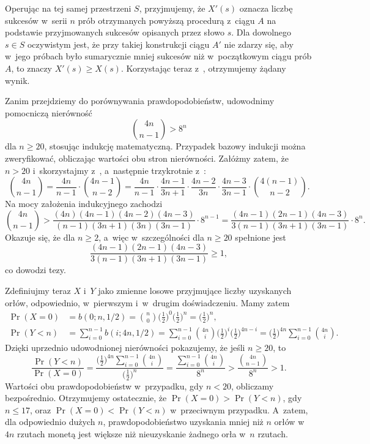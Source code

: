 Operując na tej samej przestrzeni $S$, przyjmujemy, że $X'(s)$ oznacza liczbę sukcesów w~serii $n$ prób otrzymanych powyższą procedurą z~ciągu $A$ na podstawie przyjmowanych sukcesów opisanych przez słowo $s$.
Dla dowolnego $s\in S$ oczywistym jest, że przy takiej konstrukcji ciągu $A'$ nie zdarzy się, aby w~jego próbach było sumarycznie mniej sukcesów niż w~początkowym ciągu prób $A$, to znaczy $X'(s)\ge X(s)$.
Korzystając teraz z~, otrzymujemy żądany wynik.


\exercise %
Zanim przejdziemy do porównywania prawdopodobieństw, udowodnimy pomocniczą nierówność
\[
    \binom{4n}{n-1} > 8^n
\]
dla $n\ge20$, stosując indukcję matematyczną.
Przypadek bazowy indukcji można zweryfikować, obliczając wartości obu stron nierówności.
Załóżmy zatem, że $n>20$ i~skorzystajmy z~, a~następnie trzykrotnie z~:
\[
    \binom{4n}{n-1} = \frac{4n}{n-1}\cdot\binom{4n-1}{n-2} = \frac{4n}{n-1}\cdot\frac{4n-1}{3n+1}\cdot\frac{4n-2}{3n}\cdot\frac{4n-3}{3n-1}\cdot\binom{4(n-1)}{n-2}.
\]
Na mocy założenia indukcyjnego zachodzi
\[
    \binom{4n}{n-1} > \frac{(4n)(4n-1)(4n-2)(4n-3)}{(n-1)(3n+1)(3n)(3n-1)}\cdot8^{n-1} = \frac{(4n-1)(2n-1)(4n-3)}{3(n-1)(3n+1)(3n-1)}\cdot8^n.
\]
Okazuje się, że dla $n\ge2$, a~więc w~szczególności dla $n\ge20$ spełnione jest
\[
    \frac{(4n-1)(2n-1)(4n-3)}{3(n-1)(3n+1)(3n-1)} \ge 1,
\]
co dowodzi tezy.

Zdefiniujmy teraz $X$ i~$Y$ jako zmienne losowe przyjmujące liczby uzyskanych orłów, odpowiednio, w~pierwszym i~w~drugim doświadczeniu.
Mamy zatem
\begin{align*}
	\Pr(X=0) &= b(0;n,1/2) = \binom{n}{0}\biggl(\frac{1}{2}\biggr)^0\biggl(\frac{1}{2}\biggr)^n = \biggl(\frac{1}{2}\biggr)^n, \\
	\Pr(Y<n) &= \sum_{i=0}^{n-1}b(i;4n,1/2) = \sum_{i=0}^{n-1}\binom{4n}{i}\biggl(\frac{1}{2}\biggr)^i\biggl(\frac{1}{2}\biggr)^{4n-i} = \biggl(\frac{1}{2}\biggr)^{4n}\sum_{i=0}^{n-1}\binom{4n}{i}.
\end{align*}
Dzięki uprzednio udowodnionej nierówności pokazujemy, że jeśli $n\ge20$, to
\[
    \frac{\Pr(Y<n)}{\Pr(X=0)} = \frac{\bigl(\frac{1}{2}\bigr)^{4n}\sum_{i=0}^{n-1}\binom{4n}{i}}{\bigl(\frac{1}{2}\bigr)^n} = \frac{\sum_{i=0}^{n-1}\binom{4n}{i}}{8^n} > \frac{\binom{4n}{n-1}}{8^n} > 1.
\]
Wartości obu prawdopodobieństw w~przypadku, gdy $n<20$, obliczamy bezpośrednio.
Otrzymujemy ostatecznie, że $\Pr(X=0)>\Pr(Y<n)$, gdy $n\le17$, oraz $\Pr(X=0)<\Pr(Y<n)$ w~przeciwnym przypadku.
A~zatem, dla odpowiednio dużych $n$, prawdopodobieństwo uzyskania mniej niż $n$ orłów w~$4n$ rzutach monetą jest większe niż nieuzyskanie żadnego orła w~$n$ rzutach.

